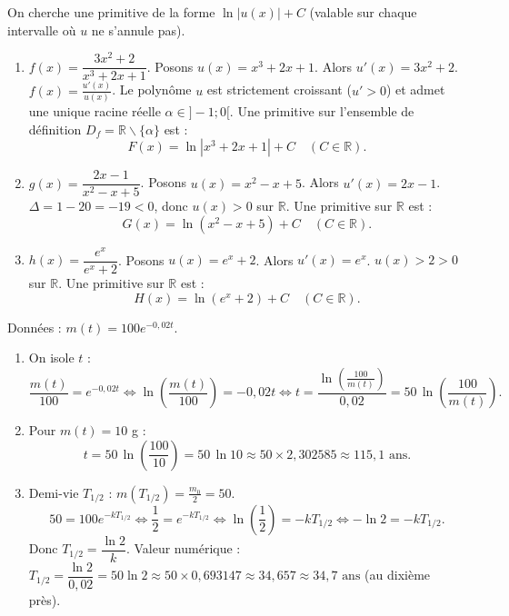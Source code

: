 \documentclass[11pt]{article}
\def\setminus{\mathbin{\backslash}}\let\smallsetminus\setminus
\begin{document}
\begin{corrige}
On cherche une primitive de la forme $\ln|u(x)| + C$ (valable sur chaque intervalle où $u$ ne s'annule pas).
\begin{enumerate}
    \item $f(x) = \dfrac{3x^2+2}{x^3+2x+1}$.
    Posons $u(x) = x^3+2x+1$. Alors $u'(x) = 3x^2+2$.
    $f(x) = \frac{u'(x)}{u(x)}$.
    Le polynôme $u$ est strictement croissant ($u'>0$) et admet une unique racine réelle $\alpha \in ]-1;0[$.
    Une primitive sur l'ensemble de définition $D_f = \mathbb{R}\setminus\{\alpha\}$ est :
    \[
    F(x) = \ln|x^3+2x+1| + C \quad (C \in \mathbb{R}).
    \]
    \item $g(x) = \dfrac{2x-1}{x^2-x+5}$.
    Posons $u(x) = x^2-x+5$. Alors $u'(x) = 2x-1$.
    $\Delta = 1-20 = -19 < 0$, donc $u(x) > 0$ sur $\mathbb{R}$.
    Une primitive sur $\mathbb{R}$ est :
    \[
    G(x) = \ln(x^2-x+5) + C \quad (C \in \mathbb{R}).
    \]
    \item $h(x) = \dfrac{e^x}{e^x+2}$.
    Posons $u(x) = e^x+2$. Alors $u'(x) = e^x$.
    $u(x) > 2 > 0$ sur $\mathbb{R}$.
    Une primitive sur $\mathbb{R}$ est :
    \[
    H(x) = \ln(e^x+2) + C \quad (C \in \mathbb{R}).
    \]
\end{enumerate}
\end{corrige}

\begin{corrige}
Données : $m(t) = 100 e^{-0,02t}$.
\begin{enumerate}
    \item On isole $t$ :
    \[
    \frac{m(t)}{100} = e^{-0,02t} \iff \ln\left(\frac{m(t)}{100}\right) = -0,02t \iff t = \frac{\ln\left(\frac{100}{m(t)}\right)}{0,02} = 50\,\ln\left(\frac{100}{m(t)}\right).
    \]
    \item Pour $m(t) = 10$ g :
    \[
    t = 50\,\ln\left(\frac{100}{10}\right) = 50\,\ln 10 \approx 50 \times 2,302585 \approx 115,1 \text{ ans}.
    \]
    \item Demi-vie $T_{1/2}$ : $m(T_{1/2}) = \frac{m_0}{2} = 50$.
    \[
    50 = 100 e^{-k T_{1/2}} \iff \frac{1}{2} = e^{-k T_{1/2}} \iff \ln\left(\frac{1}{2}\right) = -k T_{1/2} \iff -\ln 2 = -k T_{1/2}.
    \]
    Donc $\boxed{T_{1/2} = \dfrac{\ln 2}{k}}$.
    Valeur numérique : $T_{1/2} = \dfrac{\ln 2}{0,02} = 50 \ln 2 \approx 50 \times 0,693147 \approx 34,657 \approx \boxed{34,7 \text{ ans}}$ (au dixième près).
\end{enumerate}
\end{corrige}
\end{document}
